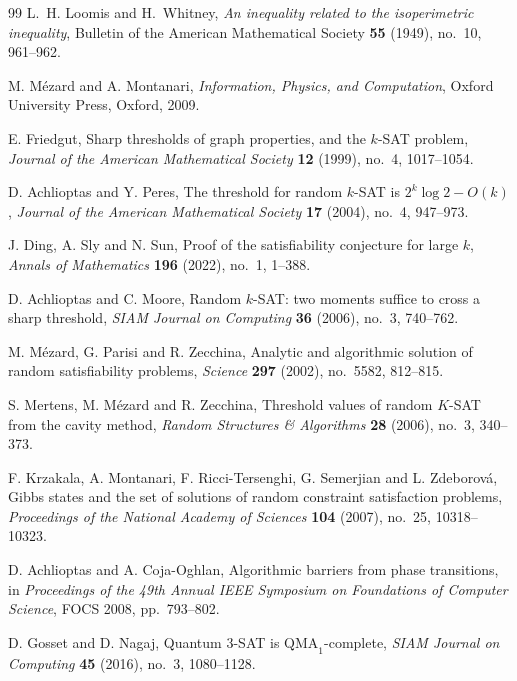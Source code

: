 \documentclass[11pt]{article}
\begin{document}
\begin{thebibliography}{99}
L.~H. Loomis and H.~Whitney,
\emph{An inequality related to the isoperimetric inequality},
Bulletin of the American Mathematical Society \textbf{55} (1949), no.~10,
961--962.

M. M{\'e}zard and A. Montanari,
\emph{Information, Physics, and Computation},
Oxford University Press, Oxford, 2009.

E. Friedgut,
Sharp thresholds of graph properties, and the \(k\)-SAT problem,
\emph{Journal of the American Mathematical Society} \textbf{12} (1999),
no.~4, 1017--1054.

D. Achlioptas and Y. Peres,
The threshold for random \(k\)-SAT is \(2^k \log 2 - O(k)\),
\emph{Journal of the American Mathematical Society} \textbf{17} (2004),
no.~4, 947--973.

J. Ding, A. Sly and N. Sun,
Proof of the satisfiability conjecture for large \(k\),
\emph{Annals of Mathematics} \textbf{196} (2022),
no.~1, 1--388.

D. Achlioptas and C. Moore,
Random \(k\)-SAT: two moments suffice to cross a sharp threshold,
\emph{SIAM Journal on Computing} \textbf{36} (2006),
no.~3, 740--762.

M. M{\'e}zard, G. Parisi and R. Zecchina,
Analytic and algorithmic solution of random satisfiability problems,
\emph{Science} \textbf{297} (2002),
no.~5582, 812--815.

S. Mertens, M. M{\'e}zard and R. Zecchina,
Threshold values of random \(K\)-SAT from the cavity method,
\emph{Random Structures \& Algorithms} \textbf{28} (2006),
no.~3, 340--373.

F. Krzakala, A. Montanari, F. Ricci-Tersenghi, G. Semerjian and L. Zdeborov{\'a},
Gibbs states and the set of solutions of random constraint satisfaction problems,
\emph{Proceedings of the National Academy of Sciences} \textbf{104} (2007),
no.~25, 10318--10323.

D. Achlioptas and A. Coja-Oghlan,
Algorithmic barriers from phase transitions,
in \emph{Proceedings of the 49th Annual IEEE Symposium on Foundations of Computer Science},
FOCS 2008, pp.~793--802.


D. Gosset and D. Nagaj,
Quantum \(3\)-SAT is \(\mathrm{QMA}_1\)-complete,
\emph{SIAM Journal on Computing} \textbf{45} (2016),
no.~3, 1080--1128. 


\end{thebibliography}
\end{document}
